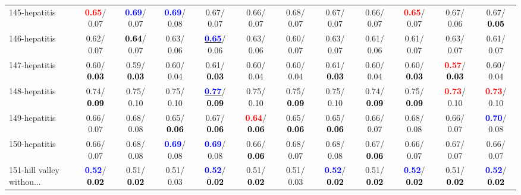 \begin{table}[h]
\begin{center}
{\begin{tabular}{lc|c|c|c|c|c|c|c|c|c|c}
145-hepatitis & \textcolor{red}{\textbf{  0.65}}/  0.07 & \textcolor{blue}{\textbf{  0.69}}/  0.07 & \textcolor{blue}{\textbf{  0.69}}/  0.08 &   0.67/  0.07 &   0.66/  0.07 &   0.68/  0.07 &   0.67/  0.07 &   0.66/  0.07 & \textcolor{red}{\textbf{  0.65}}/  0.07 &   0.67/  0.06 &   0.67/\textcolor{black}{\textbf{  0.05}} \\
146-hepatitis &   0.62/  0.07 & \textcolor{black}{\textbf{  0.64}}/  0.07 &   0.63/  0.06 & \underline{\textcolor{blue}{\textbf{  0.65}}}/  0.06 &   0.63/  0.06 &   0.60/  0.07 &   0.63/  0.07 &   0.61/  0.06 &   0.61/  0.07 &   0.63/  0.07 &   0.61/  0.07 \\
147-hepatitis &   0.60/\textcolor{black}{\textbf{  0.03}} &   0.59/\textcolor{black}{\textbf{  0.03}} &   0.60/  0.04 &   0.61/\textcolor{black}{\textbf{  0.03}} &   0.60/  0.04 &   0.60/  0.04 &   0.61/\textcolor{black}{\textbf{  0.03}} &   0.60/  0.04 &   0.60/\textcolor{black}{\textbf{  0.03}} & \textcolor{red}{\textbf{  0.57}}/\textcolor{black}{\textbf{  0.03}} &   0.60/  0.04 \\
148-hepatitis &   0.74/\textcolor{black}{\textbf{  0.09}} &   0.75/  0.10 &   0.75/  0.10 & \underline{\textcolor{blue}{\textbf{  0.77}}}/\textcolor{black}{\textbf{  0.09}} &   0.75/  0.10 &   0.75/\textcolor{black}{\textbf{  0.09}} &   0.75/  0.10 &   0.74/\textcolor{black}{\textbf{  0.09}} &   0.75/\textcolor{black}{\textbf{  0.09}} & \textcolor{red}{\textbf{  0.73}}/  0.10 & \textcolor{red}{\textbf{  0.73}}/  0.10 \\
149-hepatitis &   0.66/  0.07 &   0.68/  0.08 &   0.65/\textcolor{black}{\textbf{  0.06}} &   0.67/\textcolor{black}{\textbf{  0.06}} & \textcolor{red}{\textbf{  0.64}}/\textcolor{black}{\textbf{  0.06}} &   0.65/\textcolor{black}{\textbf{  0.06}} &   0.65/\textcolor{black}{\textbf{  0.06}} &   0.66/  0.07 &   0.68/  0.08 &   0.66/  0.07 & \textcolor{blue}{\textbf{  0.70}}/  0.08 \\ \hline
150-hepatitis &   0.66/  0.07 &   0.68/  0.08 & \textcolor{blue}{\textbf{  0.69}}/  0.08 & \textcolor{blue}{\textbf{  0.69}}/  0.08 &   0.66/\textcolor{black}{\textbf{  0.06}} &   0.68/  0.07 &   0.68/  0.08 &   0.67/\textcolor{black}{\textbf{  0.06}} &   0.66/  0.07 &   0.67/  0.07 &   0.66/  0.07 \\
151-hill valley withou... & \textcolor{blue}{\textbf{  0.52}}/\textcolor{black}{\textbf{  0.02}} &   0.51/\textcolor{black}{\textbf{  0.02}} &   0.51/  0.03 & \textcolor{blue}{\textbf{  0.52}}/\textcolor{black}{\textbf{  0.02}} &   0.51/\textcolor{black}{\textbf{  0.02}} &   0.51/  0.03 & \textcolor{blue}{\textbf{  0.52}}/\textcolor{black}{\textbf{  0.02}} &   0.51/\textcolor{black}{\textbf{  0.02}} & \textcolor{blue}{\textbf{  0.52}}/\textcolor{black}{\textbf{  0.02}} &   0.51/\textcolor{black}{\textbf{  0.02}} & \textcolor{blue}{\textbf{  0.52}}/\textcolor{black}{\textbf{  0.02}} \\

\end{tabular}}
\end{center}
\end{table}
